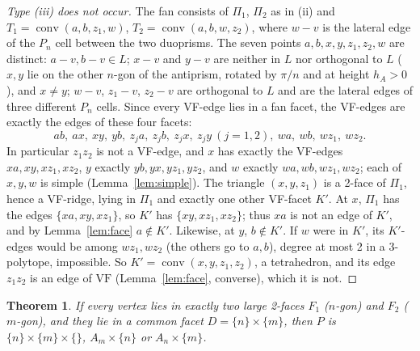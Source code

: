 \documentclass[11pt]{article}
\newtheorem{theorem}{Theorem}
\theoremstyle{definition}
\theoremstyle{remark}
\newcommand{\VF}{\mathrm{VF}}
\newcommand{\conv}{\operatorname{conv}}
\begin{document}
\begin{proof}[Type (iii) does not occur]
The fan consists of $\Pi_1$, $\Pi_2$ as in (ii) and $T_1=\conv(a,b,z_1,w)$,
$T_2=\conv(a,b,w,z_2)$, where $w-v$ is the lateral edge of the $P_n$ cell
between the two duoprisms. The seven points $a,b,x,y,z_1,z_2,w$ are
distinct: $a-v,b-v\in L$; $x-v$ and $y-v$ are neither in $L$ nor orthogonal
to $L$ ($x,y$ lie on the other $n$-gon of the antiprism, rotated by $\pi/n$
and at height $h_A>0$), and $x\ne y$; $w-v$, $z_1-v$, $z_2-v$ are orthogonal
to $L$ and are the lateral edges of three different $P_n$ cells. Since
every VF-edge lies in a fan facet, the VF-edges are exactly the edges of
these four facets:
\[ab,\ ax,\ xy,\ yb,\ z_ja,\ z_jb,\ z_jx,\ z_jy\ (j=1,2),\ wa,\ wb,\ wz_1,\ wz_2.\]
In particular $z_1z_2$ is not a VF-edge, and $x$ has exactly the VF-edges
$xa,xy,xz_1,xz_2$, $y$ exactly $yb,yx,yz_1,yz_2$, and $w$ exactly
$wa,wb,wz_1,wz_2$; each of $x,y,w$ is simple (Lemma~\ref{lem:simple}). The
triangle $(x,y,z_1)$ is a 2-face of $\Pi_1$, hence a VF-ridge, lying in
$\Pi_1$ and exactly one other VF-facet $K'$. At $x$, $\Pi_1$ has the edges
$\{xa,xy,xz_1\}$, so $K'$ has $\{xy,xz_1,xz_2\}$; thus $xa$ is not an edge of
$K'$, and by Lemma~\ref{lem:face} $a\notin K'$. Likewise, at $y$, $b\notin
K'$. If $w$ were in $K'$, its $K'$-edges would be among $wz_1,wz_2$ (the
others go to $a,b$), degree at most 2 in a 3-polytope, impossible. So
$K'=\conv(x,y,z_1,z_2)$, a tetrahedron, and its edge $z_1z_2$ is an edge of
$\VF$ (Lemma~\ref{lem:face}, converse), which it is not.
\end{proof}

\begin{theorem}\label{thm:paired}
If every vertex lies in exactly two large 2-faces $F_1$ ($n$-gon) and $F_2$
($m$-gon), and they lie in a common facet $D=\{n\}\times\{m\}$, then $P$ is
$\{n\}\times\{m\}\times\{\}$, $A_m\times\{n\}$ or $A_n\times\{m\}$.
\end{theorem}
\end{document}
